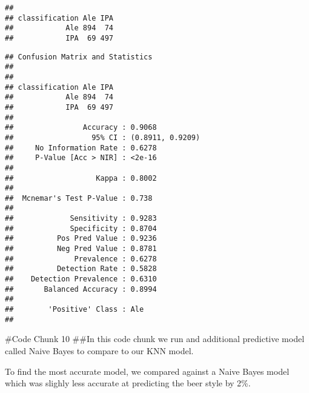 \documentclass[
]{article}
\newenvironment{Shaded}{\begin{snugshade}}{\end{snugshade}}
\newcommand{\FunctionTok}[1]{\textcolor[rgb]{0.00,0.00,0.00}{#1}}
\newcommand{\NormalTok}[1]{#1}
\newcommand{\SpecialCharTok}[1]{\textcolor[rgb]{0.00,0.00,0.00}{#1}}
\begin{document}
\begin{verbatim}
##               
## classification Ale IPA
##            Ale 894  74
##            IPA  69 497
\end{verbatim}

\begin{Shaded}
\end{Shaded}

\begin{verbatim}
## Confusion Matrix and Statistics
## 
##               
## classification Ale IPA
##            Ale 894  74
##            IPA  69 497
##                                           
##                Accuracy : 0.9068          
##                  95% CI : (0.8911, 0.9209)
##     No Information Rate : 0.6278          
##     P-Value [Acc > NIR] : <2e-16          
##                                           
##                   Kappa : 0.8002          
##                                           
##  Mcnemar's Test P-Value : 0.738           
##                                           
##             Sensitivity : 0.9283          
##             Specificity : 0.8704          
##          Pos Pred Value : 0.9236          
##          Neg Pred Value : 0.8781          
##              Prevalence : 0.6278          
##          Detection Rate : 0.5828          
##    Detection Prevalence : 0.6310          
##       Balanced Accuracy : 0.8994          
##                                           
##        'Positive' Class : Ale             
## 
\end{verbatim}

\#Code Chunk 10 \#\#In this code chunk we run and additional predictive
model called Naive Bayes to compare to our KNN model.

To find the most accurate model, we compared against a Naive Bayes model
which was slighly less accurate at predicting the beer style by 2\%.
\end{document}
